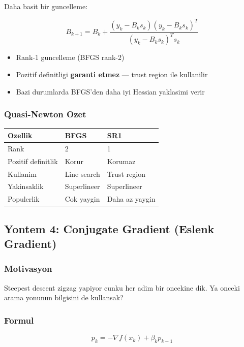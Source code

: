 \documentclass[12pt,a4paper]{article}
\theoremstyle{definition}
\theoremstyle{remark}
\begin{document}
Daha basit bir guncelleme:

\[
B_{k+1} = B_k + \frac{(y_k - B_k s_k)(y_k - B_k s_k)^T}{(y_k - B_k s_k)^T s_k}
\]

\begin{itemize}[leftmargin=*, itemsep=0.2em]
\item Rank-1 guncelleme (BFGS rank-2)
\item Pozitif definitligi \textbf{garanti etmez} --- trust region ile kullanilir
\item Bazi durumlarda BFGS'den daha iyi Hessian yaklasimi verir
\end{itemize}

\subsubsection{Quasi-Newton Ozet}

\begin{center}
\begin{tabular}{@{}lll@{}}
\toprule
\textbf{Ozellik} & \textbf{BFGS} & \textbf{SR1} \\
\midrule
Rank & 2 & 1 \\
Pozitif definitlik & Korur & Korumaz \\
Kullanim & Line search & Trust region \\
Yakinsaklik & Superlineer & Superlineer \\
Populerlik & Cok yaygin & Daha az yaygin \\
\bottomrule
\end{tabular}
\end{center}

\subsection{Yontem 4: Conjugate Gradient (Eslenk Gradient)}

\subsubsection{Motivasyon}

Steepest descent zigzag yapiyor cunku her adim bir oncekine dik. Ya onceki arama yonunun bilgisini de kullansak?

\subsubsection{Formul}

\[
\boxed{p_k = -\nabla f(x_k) + \beta_k p_{k-1}}
\]
\end{document}
